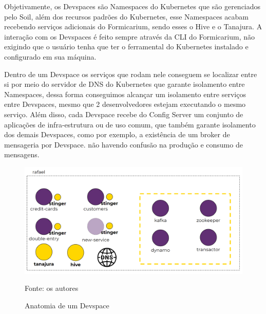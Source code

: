 \documentclass[twosideprint]{politex}
\newcommand{\legend}[1]{\begin{center}\def\caption{}\caption{#1}\end{center}}
\begin{document}
    Objetivamente, os Devspaces são Namespaces do Kubernetes que são gerenciados pelo Soil, além dos recursos padrões do Kubernetes, esse Namespaces acabam recebendo serviços adicionais do Formicarium, sendo esses o Hive e o Tanajura. A interação com os Devspaces é feito sempre através da CLI do Formicarium, não exigindo que o usuário tenha que ter o ferramental do Kubernetes instalado e configurado em sua máquina.
    
    Dentro de um Devspace os serviços que rodam nele conseguem se localizar entre si por meio do servidor de DNS do Kubernetes que garante isolamento entre Namespaces, dessa forma conseguimos alcançar um isolamento entre serviços entre Devspaces, mesmo que 2 desenvolvedores estejam executando o mesmo serviço. Além disso, cada Devspace recebe do Config Server um conjunto de aplicações de infra-estrutura ou de uso comum, que também garante isolamento dos demais Devspaces, como por exemplo, a existência de um broker de mensageria por Devspace. não havendo confusão na produção e consumo de mensagens.
    
        \begin{figure}[htbp]
			\caption{\label{fig_devspace1}Anatomia de um Devspace}
			\begin{center}
			\includegraphics[scale=0.30]{pictures/devspace1.png}
			\end{center}
			\legend{Fonte: os autores}
		\end{figure}
    
\end{document}
